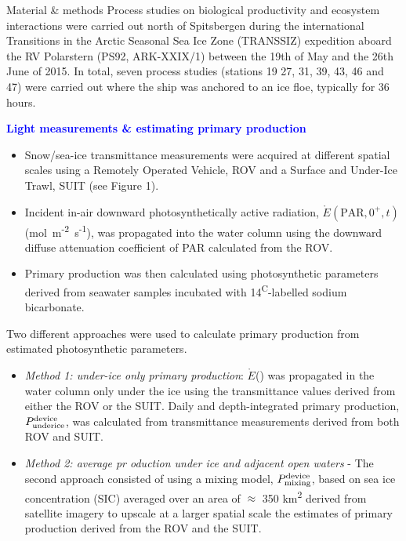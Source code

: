 \documentclass[final]{beamer}
\newlength{\colwidth}
\newcommand{\eparzero}{\ensuremath{\mathring{E}(\text{PAR}, 0^+, t)}}
\newcommand{\micromol}{\textmu mol~m\textsuperscript{-2}~s\textsuperscript{-1}}
\newcommand{\eparscalar}{\ensuremath{\mathring{E}}(\text{PAR})}
\newcommand{\ppundericedevice}{\ensuremath{P_{\text{\scriptsize underice}}^{\text{\scriptsize device}}}}
\newcommand{\ppmixingdevice}{\ensuremath{P_{\text{\scriptsize mixing}}^{\text{\scriptsize device}}}}
\begin{document}
\begin{frame}[t]
\begin{columns}[t]
\begin{column}{\colwidth}
\begin{block}{\small Material \& methods}
				Process studies on biological productivity and ecosystem interactions were carried out north of Spitsbergen during the international Transitions in the Arctic Seasonal Sea Ice Zone (TRANSSIZ) expedition aboard the RV Polarstern (PS92, ARK-XXIX/1) between the 19th of May and the 26th June of 2015. In total, seven process studies (stations 19 27, 31, 39, 43, 46 and 47) were carried out where the ship was anchored to an ice floe, typically for 36 hours.

				\textcolor{blue}{\textbf{Light measurements \& estimating primary production}}

				\begin{itemize}
					\justifying
					\item Snow/sea-ice transmittance measurements were acquired at different spatial scales using a Remotely Operated Vehicle, ROV and a Surface and Under-Ice Trawl, SUIT (see Figure 1).
					\item Incident in-air downward photosynthetically active radiation, \eparzero{} (\micromol{}), was propagated into the water column using the downward diffuse attenuation coefficient of PAR calculated from the ROV.
					\item Primary production was then calculated using photosynthetic parameters derived from seawater samples incubated with 14\textsuperscript{C}-labelled sodium bicarbonate.
				\end{itemize}

				Two different approaches were used to calculate primary production from estimated photosynthetic parameters.

				\begin{itemize}
					\justifying
					\item \textit{Method 1: under-ice only primary production}: \eparscalar{} was propagated in the water column only under the ice using the transmittance values derived from either the ROV or the SUIT. Daily and depth-integrated primary production, \ppundericedevice{}, was calculated from transmittance measurements derived from both ROV and SUIT.
					\item \textit{Method 2: average pr oduction under ice and adjacent open waters} - The second approach consisted of using a mixing model, \ppmixingdevice{}, based on sea ice concentration (SIC) averaged over an area of $\approx$ 350 km\textsuperscript{2} derived from satellite imagery to upscale at a larger spatial scale the estimates of primary production derived from the ROV and the SUIT.
				\end{itemize}
			\end{block}


\end{column}
\end{columns}
\end{frame}
\end{document}

